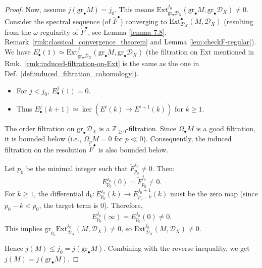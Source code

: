 \begin{proof}
    Now, assume $j(\mathrm{gr}_{\bullet}M)=j_{0}$. This means $\mathrm{Ext}^{j_{0}}_{\mathrm{gr_{\bullet}\mathcal{D}_{X}}}(\mathrm{gr}_{\bullet}M,\mathrm{gr}_{\bullet}\mathcal{D}_{X})\neq 0$.
    Consider the spectral sequence (of $\check{F}^\bullet$) converging to $\mathrm{Ext}_{\mathcal{D}_{X}}^{\bullet}(M,\mathcal{D}_{X})$ (resulting from the $\omega$-regularity of $\check{F}^\bullet$,
    see Lemma \ref{lemma 7.8}, Remark~\ref{rmk:classical_convergence_theorem} and Lemma \ref{lem:checkF-regular}).
    We have $E^{j}_{\bullet}(1) \simeq \mathrm{Ext}^{j}_{\mathrm{gr}_{\bullet}\mathcal{D}_{X}}(\mathrm{gr}_{\bullet}M,\mathrm{gr}_{\bullet}\mathcal{D}_{X})$ (the filtration on $\mathrm{Ext}$ mentioned in Rmk.~\ref{rmk:induced-filtration-on-Ext} is the same as the one in Def.~\ref{def:induced_filtration_cohomology}).
    \begin{itemize}
        \item For $j < j_0$, $E^{j}_{\bullet}(1) = 0$.
        \item Thus $E^{j}_{\bullet}(k+1) \simeq \ker(E^{i}(k)\rightarrow E^{i+1}(k))$ for $k \ge 1$.
    \end{itemize}

    The order filtration on $\mathrm{gr}_{\bullet}\mathcal{D}_{X}$ is a $\mathbb{Z}_{\ge 0}$-filtration. Since $\Omega_{\bullet}M$ is a good filtration, it is bounded below (i.e., $\Omega_{p}M=0$ for $p \ll 0$). Consequently, the induced filtration on the resolution $\check{F}^{\bullet}$ is also bounded below.

    Let $p_{0}$ be the minimal integer such that $\check{F}^{j_{0}}_{p_{0}} \neq 0$.
    Then:
    \[
        E^{j_{0}}_{p_{0}}(0) = \check{F}^{j_{0}}_{p_{0}} \neq 0.
    \]
    For $k \ge 1$, the differential $\mathrm{d}_{k}: E^{j_{0}}_{p_{0}}(k) \rightarrow E^{j_{0}+1}_{p_{0}-k}(k)$ must be the zero map (since $p_0-k < p_0$, the target term is 0).
    Therefore,
    \[
        E^{j_{0}}_{p_{0}}(\infty) = E^{j_{0}}_{p_{0}}(0) \neq 0.
    \]
    This implies $\mathrm{gr}_{p_{0}}\mathrm{Ext}_{\mathcal{D}_{X}}^{j_{0}}(M,\mathcal{D}_{X}) \neq 0$, so $\mathrm{Ext}_{\mathcal{D}_{X}}^{j_{0}}(M,\mathcal{D}_{X}) \neq 0$.

    Hence $j(M) \le j_{0} = j(\mathrm{gr}_{\bullet}M)$. Combining with the reverse inequality, we get $j(M) = j(\mathrm{gr}_{\bullet}M)$.
\end{proof}

